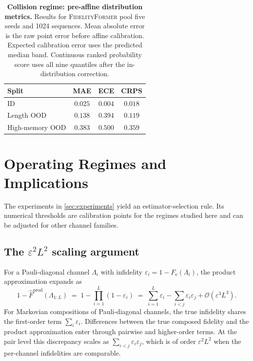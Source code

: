 \documentclass[12pt]{iopart}
\providecommand{\bm}[1]{\boldsymbol{#1}}
\newcommand{\Fe}{F_{\mathrm{e}}}
\newcommand{\Fhat}{\widehat{F}}
\newcommand{\Lset}{\Lambda}
\newcommand{\eps}{\varepsilon}
\newcommand{\fidno}{\textsc{FidelityFormer}}
\begin{document}
\begin{table}[h]
\centering
\caption{\textbf{Collision regime: pre-affine distribution metrics.} Results for \fidno{} pool five seeds and 1024 sequences. Mean absolute error is the raw point error before affine calibration. Expected calibration error uses the predicted median band. Continuous ranked probability score uses all nine quantiles after the in-distribution correction.}
\label{tab:cal_metrics}
\begin{tabular}{lccc}
\toprule
Split & MAE & ECE & CRPS \\
\midrule
ID              & $0.025$ & $\bm{0.004}$ & $0.018$ \\
Length OOD      & $0.138$ & $0.394$ & $0.119$ \\
High-memory OOD & $0.383$ & $0.500$ & $0.359$ \\
\bottomrule
\end{tabular}
\end{table}


\section{Operating Regimes and Implications}
\label{sec:operating}

The experiments in \cref{sec:experiments} yield an estimator-selection rule. Its numerical thresholds are calibration points for the regimes studied here and can be adjusted for other channel families.

\subsection{The $\eps^{2} L^{2}$ scaling argument}

For a Pauli-diagonal channel $\Lset_i$ with infidelity
$\eps_i = 1-\Fe(\Lset_i)$, the product approximation expands as
\begin{equation}
1 - \Fhat^{\mathrm{prod}}(\Lset_{1:L})
\;=\;
1 - \prod_{i=1}^{L}(1-\eps_i)
\;=\;
\sum_{i=1}^{L}\eps_i
-
\sum_{i<j}\eps_i\eps_j
+
\mathcal{O}(\eps^{3}L^{3}).
\end{equation}
For Markovian compositions of Pauli-diagonal channels, the true infidelity shares the first-order term $\sum_i \eps_i$. Differences between the true composed fidelity and the product approximation enter through pairwise and higher-order terms. At the pair level this discrepancy scales as
$\sum_{i<j}\eps_i\eps_j$, which is of order $\eps^2L^2$ when the per-channel infidelities are comparable.
\end{document}
